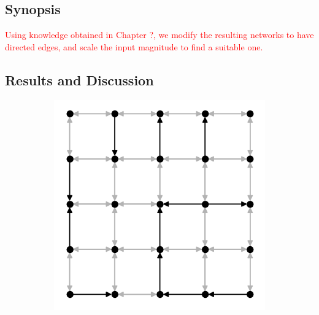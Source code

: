 \subsection{Synopsis}

\textcolor{red}{
Using knowledge obtained in Chapter ?, we modify the resulting networks to have
directed edges, and scale the input magnitude to find a suitable one.
}

\subsection{Results and Discussion}

\begin{figure}[t]
  \centering
  \begin{subfigure}{.40\textwidth}
    \centering
    \includegraphics[width=1.0\linewidth]{figures/dir_lattice_025.png}
    \caption{}
    \label{fig:dir-lattice-a}
  \end{subfigure}
  \hspace{25pt}
  \begin{subfigure}{.40\textwidth}
    \centering

\end{subfigure}
\end{figure}
